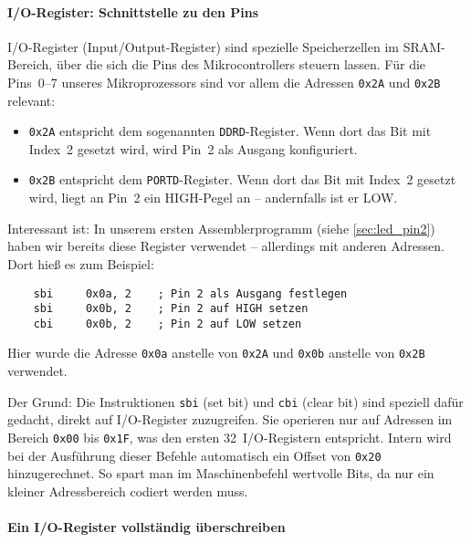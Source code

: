 \documentclass[a4paper,12pt]{article}
\begin{document}
\paragraph{I/O-Register: Schnittstelle zu den Pins}

I/O-Register (Input/Output-Register) sind spezielle Speicherzellen im
SRAM-Bereich, über die sich die Pins des Mikrocontrollers steuern lassen. Für
die Pins~0–7 unseres Mikroprozessors sind vor allem die Adressen \texttt{0x2A}
und \texttt{0x2B} relevant:

\begin{itemize}
    \item
	\texttt{0x2A} entspricht dem sogenannten \texttt{DDRD}-Register. Wenn
	dort das Bit mit Index~2 gesetzt wird, wird Pin~2 als Ausgang
	konfiguriert.
    \item
	\texttt{0x2B} entspricht dem \texttt{PORTD}-Register. Wenn dort das Bit
	mit Index~2 gesetzt wird, liegt an Pin~2 ein HIGH-Pegel an –
	andernfalls ist er LOW.
\end{itemize}

\noindent
Interessant ist: In unserem ersten Assemblerprogramm (siehe
\autoref{sec:led_pin2}) haben wir bereits diese Register verwendet – allerdings
mit anderen Adressen. Dort hieß es zum Beispiel:

\begin{lstlisting}
    sbi     0x0a, 2    ; Pin 2 als Ausgang festlegen
    sbi     0x0b, 2    ; Pin 2 auf HIGH setzen
    cbi     0x0b, 2    ; Pin 2 auf LOW setzen
\end{lstlisting}

\noindent
Hier wurde die Adresse \texttt{0x0a} anstelle von \texttt{0x2A} und
\texttt{0x0b} anstelle von \texttt{0x2B} verwendet.

\noindent
Der Grund: Die Instruktionen \texttt{sbi} (set bit) und \texttt{cbi} (clear
bit) sind speziell dafür gedacht, direkt auf I/O-Register zuzugreifen. Sie
operieren nur auf Adressen im Bereich \texttt{0x00} bis \texttt{0x1F}, was den
ersten 32~I/O-Registern entspricht. Intern wird bei der Ausführung dieser
Befehle automatisch ein Offset von \texttt{0x20} hinzugerechnet. So spart man
im Maschinenbefehl wertvolle Bits, da nur ein kleiner Adressbereich codiert
werden muss.



\paragraph{Ein I/O-Register vollständig überschreiben}
\end{document}
